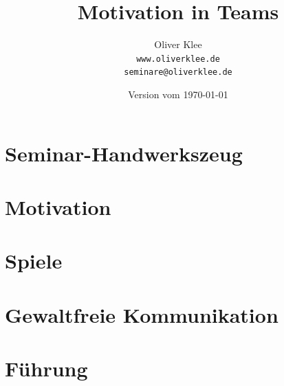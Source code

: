 \documentclass[a4paper,openany,twoside,titlepage,10pt,headsepline]{scrbook}
\title{Motivation in Teams}
\author{Oliver Klee\\\texttt{www.oliverklee.de}\\\texttt{seminare@oliverklee.de}}
\date{Version vom \today}
\begin{document}
    \frontmatter

    \maketitle

    \tableofcontents


    \mainmatter


    \chapter{Seminar-Handwerkszeug}
    
    
    
    


    \chapter{Motivation}
    
    
    


    \chapter{Spiele}
    
    
    


    \chapter{Gewaltfreie Kommunikation}
    
    
    
    


    \chapter{Führung}
    
    
    
    
    

    \backmatter

    

    

    \printindex
\end{document}
